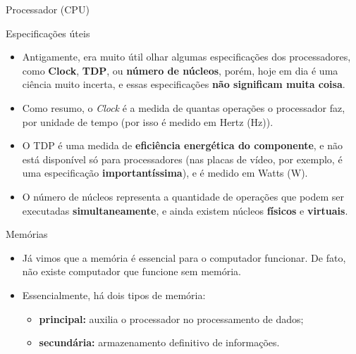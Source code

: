 \begin{frame}{Processador (CPU)}
	\begin{block}{Especificações úteis}
		\begin{itemize}
			\item Antigamente, era muito útil olhar algumas especificações dos processadores, como \textbf{Clock}, \textbf{TDP}, ou \textbf{número de núcleos}, porém, hoje em dia é uma ciência muito incerta, e essas especificações \textbf{não significam muita coisa}.
			\item Como resumo, o \textit{Clock} é a medida de quantas operações o processador faz, por unidade de tempo (por isso é medido em Hertz (\si{\hertz})).
			\item O TDP é uma medida de \textbf{eficiência energética do componente}, e não está disponível só para processadores (nas placas de vídeo, por exemplo, é uma especificação \textbf{importantíssima}), e é medido em Watts (\si{\watt}).
			\item O número de núcleos representa a quantidade de operações que podem ser executadas \textbf{simultaneamente}, e ainda existem núcleos \textbf{físicos} e \textbf{virtuais}.
		\end{itemize}
	\end{block}
\end{frame}


\begin{frame}{Memórias}
	\begin{block}{}
		\begin{itemize}
			\item Já vimos que a memória é essencial para o computador funcionar. De fato, não existe computador que funcione sem memória.
			\item Essencialmente, há dois tipos de memória:
			      \begin{itemize}
				      \item\normalsize \textbf{principal:} auxilia o processador no processamento de dados;
				      \item\normalsize \textbf{secundária:} armazenamento definitivo de informações.
			      \end{itemize}
		\end{itemize}
	\end{block}

\end{frame}


